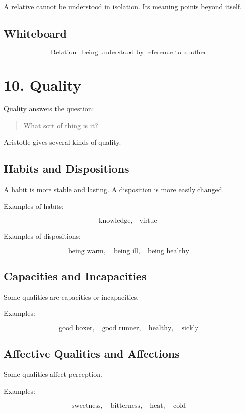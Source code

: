 \documentclass[12pt]{article}
\begin{document}
A relative cannot be understood in isolation. Its meaning points beyond itself.

\subsection*{Whiteboard}

\[
\boxed{
\text{Relation} = \text{being understood by reference to another}
}
\]

\section*{10. Quality}

Quality answers the question:

\begin{quote}
What sort of thing is it?
\end{quote}

Aristotle gives several kinds of quality.

\subsection*{Habits and Dispositions}

A habit is more stable and lasting. A disposition is more easily changed.

Examples of habits:

\[
\text{knowledge}, \quad \text{virtue}
\]

Examples of dispositions:

\[
\text{being warm}, \quad \text{being ill}, \quad \text{being healthy}
\]

\subsection*{Capacities and Incapacities}

Some qualities are capacities or incapacities.

Examples:

\[
\text{good boxer}, \quad \text{good runner}, \quad \text{healthy}, \quad \text{sickly}
\]

\subsection*{Affective Qualities and Affections}

Some qualities affect perception.

Examples:

\[
\text{sweetness}, \quad \text{bitterness}, \quad \text{heat}, \quad \text{cold}
\]
\end{document}
